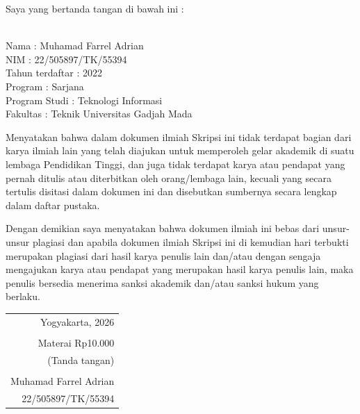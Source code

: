 \noindent Saya yang bertanda tangan di bawah ini :

\vspace{-1em}

\begin{tabbing}
\hspace{40mm} \= \\ %
\noindent Nama \> : Muhamad Farrel Adrian \\[\parskip]
\noindent NIM \> : 22/505897/TK/55394 \\[\parskip]
\noindent Tahun terdaftar \> : 2022 \\[\parskip]
\noindent Program \> : Sarjana \\[\parskip]
\noindent Program Studi \> : Teknologi Informasi \\[\parskip]
\noindent Fakultas \> : Teknik Universitas Gadjah Mada
\end{tabbing}

\noindent Menyatakan bahwa dalam dokumen ilmiah Skripsi ini tidak terdapat bagian dari karya ilmiah lain yang telah diajukan untuk memperoleh gelar akademik di suatu lembaga Pendidikan Tinggi, dan juga tidak terdapat karya atau pendapat yang pernah ditulis atau diterbitkan oleh orang/lembaga lain, kecuali yang secara tertulis disitasi dalam dokumen ini dan disebutkan sumbernya secara lengkap dalam daftar pustaka.

\noindent Dengan demikian saya menyatakan bahwa dokumen ilmiah ini bebas dari unsur-unsur plagiasi dan apabila dokumen ilmiah Skripsi ini di kemudian hari terbukti merupakan plagiasi dari hasil karya penulis lain dan/atau dengan sengaja mengajukan karya atau pendapat yang merupakan hasil karya penulis lain, maka penulis bersedia menerima sanksi akademik dan/atau sanksi hukum yang berlaku.

\begin{flushright}
\begin{tabular}{r}
Yogyakarta, 2026 \\
\vspace{0.1cm} \\
\tiny{Materai Rp10.000} \\
\tiny{(Tanda tangan)} \\
\vspace{0.1cm} \\
Muhamad Farrel Adrian \\ 22/505897/TK/55394
\end{tabular}
\end{flushright}
